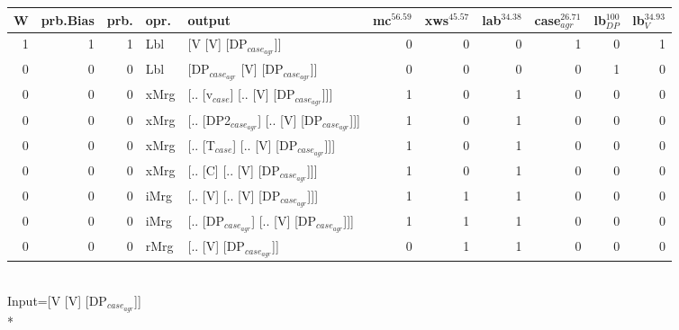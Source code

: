 \begin{tabularx}{\linewidth}{rrrlXrrrrrr}
\hline
   W &   prb.Bias &   prb. & opr.   & output                                     &   mc$^{56.59}$ &   xws$^{45.57}$ &   lab$^{34.38}$ &   case$_{agr}^{26.71}$ &   lb$_{DP}^{100}$ &   lb$_{V}^{34.93}$ \\
\hline
   1 &       1 &   1 & Lbl  & [V [V] [DP$_{case_{agr}}$]]                      &            0 &             0 &             0 &                  1 &                0 &              1 \\
   0 &       0 &   0 & Lbl  & [DP$_{case_{agr}}$ [V] [DP$_{case_{agr}}$]]            &            0 &             0 &             0 &                  0 &                1 &              0 \\
   0 &       0 &   0 & xMrg & [.. [v$_{case}$] [.. [V] [DP$_{case_{agr}}$]]]       &            1 &             0 &             1 &                  0 &                0 &              0 \\
   0 &       0 &   0 & xMrg & [.. [DP2$_{case_{agr}}$] [.. [V] [DP$_{case_{agr}}$]]] &            1 &             0 &             1 &                  0 &                0 &              0 \\
   0 &       0 &   0 & xMrg & [.. [T$_{case}$] [.. [V] [DP$_{case_{agr}}$]]]       &            1 &             0 &             1 &                  0 &                0 &              0 \\
   0 &       0 &   0 & xMrg & [.. [C] [.. [V] [DP$_{case_{agr}}$]]]            &            1 &             0 &             1 &                  0 &                0 &              0 \\
   0 &       0 &   0 & iMrg & [.. [V] [.. [V] [DP$_{case_{agr}}$]]]            &            1 &             1 &             1 &                  0 &                0 &              0 \\
   0 &       0 &   0 & iMrg & [.. [DP$_{case_{agr}}$] [.. [V] [DP$_{case_{agr}}$]]]  &            1 &             1 &             1 &                  0 &                0 &              0 \\
   0 &       0 &   0 & rMrg & [.. [V] [DP$_{case_{agr}}$]]                     &            0 &             1 &             1 &                  0 &                0 &              0 \\
\hline
\end{tabularx}\endgroup\\
\begingroup\scriptsize Input=[V [V] [DP$_{case_{agr}}$]]\\*
